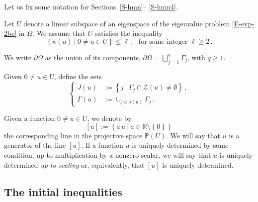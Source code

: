 \documentclass[12pt,a4paper]{amsart}
\theoremstyle{plain} %
\theoremstyle{definition}
\numberwithin{equation}{section}
\numberwithin{figure}{section}
\numberwithin{table}{section}
\newcommand{\bP}{\mathbb{P}}
\newcommand{\R}{\mathbb{R}}
\newcommand{\cZ}{\mathcal{Z}}
\newcommand{\sm}{\!\setminus\!}
\newcommand{\set}[1]{\left\lbrace #1 \right\rbrace}
\begin{document}
Let us fix some notation for  Sections~\ref{S-hmn}-- \ref{S-hmn4}.\smallskip

Let $U$ denote a linear subspace of an eigenspace of the eigenvalue problem \eqref{E-evp-2bc} in $\Omega$. We assume that $U$ satisfies the inequality
%
\begin{equation}\label{E-hmn0-2}
 \set{\kappa(u) ~|~ 0 \neq u \in U} \le \ell \,,
\text{~~for some integer~} \ell \ge 2\,.
\end{equation}
%
\medskip

We write $\partial \Omega$ as the union of its components, $\partial \Omega = \bigcup_{j=1}^q \Gamma_j$, with $q \ge 1$.\smallskip

Given $0 \neq u \in U$, define the sets
%
\begin{equation}\label{E-hmn0-4}
\left\{
\begin{array}{ll}
J(u) & := \set{j ~|~ \Gamma_j \cap \cZ(u) \neq \emptyset}\,,\\[5pt]
\Gamma(u) & := \cup_{j \in J(u)} \Gamma_j\,.
\end{array}
\right.
\end{equation}

Given a function $0 \neq u \in U$, we denote by
%
\begin{equation}\label{E-hmn0-5}
[u] := \set{a\, u ~|~ a \in \R\sm \set{0}}
\end{equation}
%
the corresponding line in the projective space $\bP(U)$. We will say that $u$ is a generator of the line $[u]$. If a function $u$ is uniquely determined by some condition, up to multiplication by a nonzero scalar, we will say that $u$ is uniquely determined \emph{up to scaling} or, equivalently, that $[u]$ is uniquely determined.


\subsection{The initial inequalities}\label{SS-hmn-0B}
\end{document}
